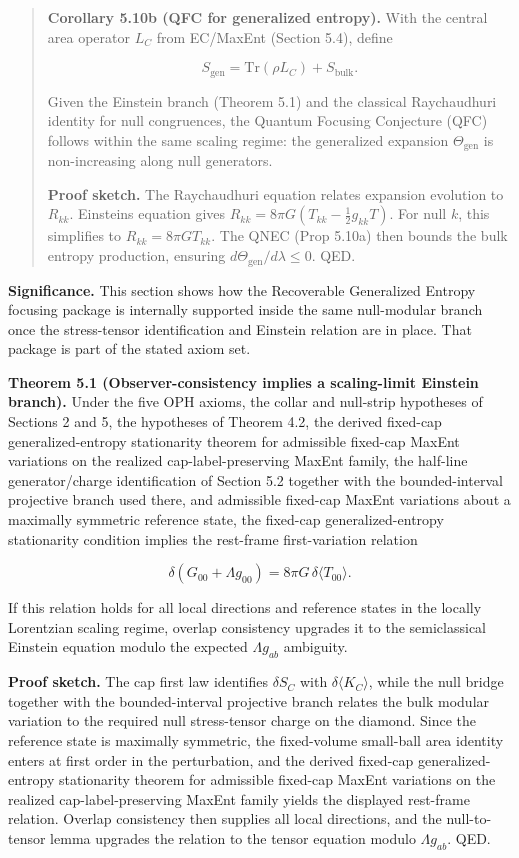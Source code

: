 \begin{quote}
\textbf{Corollary 5.10b (QFC for generalized entropy).} With the central area operator \(L_C\) from EC/MaxEnt (Section 5.4), define

\[
S_{\mathrm{gen}} = \mathrm{Tr}(\rho L_C) + S_{\mathrm{bulk}}.
\]

Given the Einstein branch (Theorem 5.1) and the classical Raychaudhuri identity for null congruences, the Quantum Focusing Conjecture (QFC) follows within the same scaling regime: the generalized expansion \(\Theta_{\mathrm{gen}}\) is non-increasing along null generators.

\textbf{Proof sketch.} The Raychaudhuri equation relates expansion evolution to \(R_{kk}\). Einstein\textquotesingle s equation gives \(R_{kk} = 8\pi G (T_{kk} - \frac{1}{2}g_{kk}T)\). For null \(k\), this simplifies to \(R_{kk} = 8\pi G T_{kk}\). The QNEC (Prop 5.10a) then bounds the bulk entropy production, ensuring \(d\Theta_{\mathrm{gen}}/d\lambda \le 0\). QED.
\end{quote}

\textbf{Significance.} This section shows how the Recoverable Generalized Entropy focusing package is internally supported inside the same null-modular branch once the stress-tensor identification and Einstein relation are in place. That package is part of the stated axiom set.

\textbf{Theorem 5.1 (Observer-consistency implies a scaling-limit Einstein branch).} Under the five OPH axioms, the collar and null-strip hypotheses of Sections 2 and 5, the hypotheses of Theorem 4.2, the derived fixed-cap generalized-entropy stationarity theorem for admissible fixed-cap MaxEnt variations on the realized cap-label-preserving MaxEnt family, the half-line generator/charge identification of Section 5.2 together with the bounded-interval projective branch used there, and admissible fixed-cap MaxEnt variations about a maximally symmetric reference state, the fixed-cap generalized-entropy stationarity condition implies the rest-frame first-variation relation

\[
\delta\!\left(G_{00}+\Lambda g_{00}\right)=8\pi G\,\delta\langle T_{00}\rangle.
\]

If this relation holds for all local directions and reference states in the locally Lorentzian scaling regime, overlap consistency upgrades it to the semiclassical Einstein equation modulo the expected \(\Lambda g_{ab}\) ambiguity.

\textbf{Proof sketch.} The cap first law identifies \(\delta S_C\) with \(\delta\langle K_C\rangle\), while the null bridge together with the bounded-interval projective branch relates the bulk modular variation to the required null stress-tensor charge on the diamond. Since the reference state is maximally symmetric, the fixed-volume small-ball area identity enters at first order in the perturbation, and the derived fixed-cap generalized-entropy stationarity theorem for admissible fixed-cap MaxEnt variations on the realized cap-label-preserving MaxEnt family yields the displayed rest-frame relation. Overlap consistency then supplies all local directions, and the null-to-tensor lemma upgrades the relation to the tensor equation modulo \(\Lambda g_{ab}\). QED.

